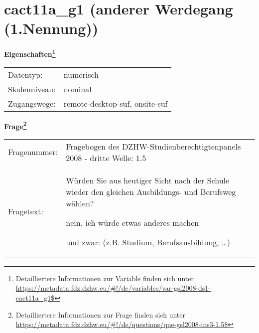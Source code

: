 
    \setcounter{footnote}{0}

    \vspace*{-1.8cm}
	\section{cact11a\_g1 (anderer Werdegang (1.Nennung))}
	\label{section:cact11a_g1}



    \vspace*{0.5cm}
    \noindent\textbf{Eigenschaften\footnote{Detailliertere Informationen zur Variable finden sich unter
		\url{https://metadata.fdz.dzhw.eu/\#!/de/variables/var-gsl2008-ds1-cact11a_g1$}}}\\
	\begin{tabularx}{\hsize}{@{}lX}
	Datentyp: & numerisch \\
	Skalenniveau: & nominal \\
	Zugangswege: &
	  remote-desktop-suf, 
	  onsite-suf
 \\
    \end{tabularx}



				\vspace*{0.5cm}
                \noindent\textbf{Frage\footnote{Detailliertere Informationen zur Frage finden sich unter
		              \url{https://metadata.fdz.dzhw.eu/\#!/de/questions/que-gsl2008-ins3-1.5$}}}\\
				\begin{tabularx}{\hsize}{@{}lX}
					Fragenummer: &
					  Fragebogen des DZHW-Studienberechtigtenpanels 2008 - dritte Welle:
					  1.5
 \\
					Fragetext: & Würden Sie aus heutiger Sicht nach der Schule wieder den gleichen Ausbildungs- und Berufsweg wählen?\par  nein, ich würde etwas anderes machen\par  und zwar: (z.B. Studium, Berufsausbildung, …) \\
				\end{tabularx}





